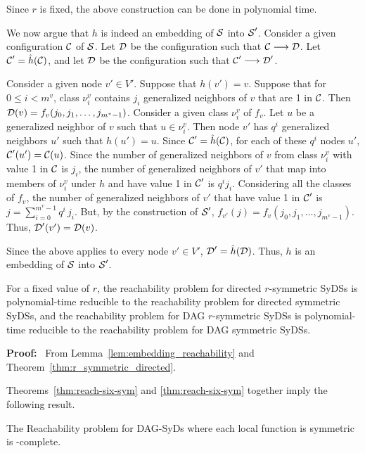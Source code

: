 Since $r$ is fixed, the above construction can be done in polynomial time.

We now argue that $h$ is indeed an embedding of $\mbox{$\mathcal{S}$}$ into $\mbox{$\mathcal{S}$}'$.
Consider a given configuration $\mbox{$\mathcal{C}$}$ of $\mbox{$\mathcal{S}$}$.
Let $\mbox{$\mathcal{D}$}$  be the configuration such that $\mbox{$\mathcal{C}$} \longrightarrow \mbox{$\mathcal{D}$}$.
Let $\mbox{$\mathcal{C}$}' =\hat{h}(\mbox{$\mathcal{C}$})$, 
and let $\mbox{$\mathcal{D}$}$  be the configuration such that $\mbox{$\mathcal{C}$}' \longrightarrow \mbox{$\mathcal{D}$}'$.

Consider a given node $v' \in V'$.
Suppose that $h(v') = v$.
Suppose that for $0 \leq i < m^v$,
class $\nu_i^v$ contains $j_i$ generalized neighbors of $v$ that are 1 in $\mbox{$\mathcal{C}$}$.
Then $\mbox{$\mathcal{D}$}(v) = f_v(j_0,  j_1, \ldots , j_{m^v -1})$.
Consider a given class $\nu_i^v$ of $f_v$.
Let $u$ be a generalized neighbor of $v$ such that $ u \in \nu_i^v$.
Then node $v'$ has $q^i$ generalized neighbors $u'$ such that $h(u') = u$.
Since $\mbox{$\mathcal{C}$}' =\hat{h}(\mbox{$\mathcal{C}$})$, for each of these $q^i$ nodes $u'$,
$\mbox{$\mathcal{C}$}'(u') = \mbox{$\mathcal{C}$}(u)$.
Since the number of generalized neighbors of $v$ from class $\nu_i^v$ 
with value 1 in $\mbox{$\mathcal{C}$}$ is $j_i$,
the number of generalized neighbors of $v'$ 
that map into members of $\nu_i^v$ under $h$ and have value 1 in $\mbox{$\mathcal{C}$}'$ is $q^i j_i$.
Considering all the classes of $f_v$,
the number of generalized neighbors of $v'$ that have value 1 in $\mbox{$\mathcal{C}$}'$ is 
$j = \sum_{i=0}^{m^v-1} q^i \, j_i$.
But, by the construction of $\mbox{$\mathcal{S}$}'$,
$f_{v'}(j) = f_v(j_0,  j_1, \ldots , j_{m^v -1})$.
Thus, $\mbox{$\mathcal{D}$}'(v') = \mbox{$\mathcal{D}$}(v)$.

Since the above applies to every node $v' \in V'$,  $\mbox{$\mathcal{D}$}' =\hat{h}(\mbox{$\mathcal{D}$})$.
Thus, $h$ is an embedding of $\mbox{$\mathcal{S}$}$ into $\mbox{$\mathcal{S}$}'$.
\QED
\fi

\begin{theorem}\label{thm:reachability_symmetric}
For a fixed value of $r$, the reachability problem for directed
$r$-symmetric  SyDSs is polynomial-time reducible to the reachability
problem for directed symmetric SyDSs, and  the reachability problem
for DAG $r$-symmetric  SyDSs is polynomial-time reducible to the
reachability problem for DAG  symmetric  SyDSs.  
\end{theorem}

\noindent 
\textbf{Proof:}~ From Lemma~\ref{lem:embedding_reachability}
and Theorem~\ref{thm:r_symmetric_directed}.  \QED

Theorems~\ref{thm:reach-six-sym} and \ref{thm:reach-six-sym}
together imply the following result.

\begin{theorem}\label{thm:dag_syds_sym_hard}
The Reachability problem for DAG-SyDs where each local function is
symmetric is \cpsp-complete. \QED
\end{theorem}

